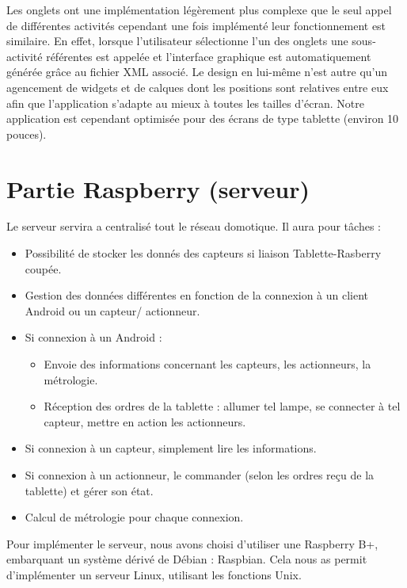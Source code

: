 \documentclass[a4paper,10pt]{article}
\begin{document}
Les onglets ont une implémentation légèrement plus complexe que le seul appel de différentes activités cependant une fois implémenté leur fonctionnement est similaire. En effet, lorsque l’utilisateur sélectionne l'un des onglets une sous-activité référentes est appelée et l’interface graphique est automatiquement générée grâce au fichier XML associé. Le design en lui-même n’est autre qu’un agencement de widgets et de calques dont les positions sont relatives entre eux afin que l’application s’adapte au mieux à toutes les tailles d’écran. Notre application est cependant optimisée pour des écrans de type tablette (environ 10 pouces).







\section{Partie Raspberry (serveur)}

Le serveur servira a centralisé tout le réseau domotique. Il aura pour tâches : \\
\begin{itemize}
	\item Possibilité de stocker les donnés des capteurs si liaison Tablette-Rasberry coupée.
	\item Gestion des données différentes en fonction de la connexion à un client Android ou un capteur/	actionneur. 
	\item Si connexion à un Android : 
		\begin{itemize}
			\item Envoie des informations concernant les capteurs, les actionneurs, la métrologie.
			\item Réception des ordres de la tablette : allumer tel lampe, se connecter à tel capteur, mettre en action les actionneurs.
		\end{itemize}
	\item Si connexion à un capteur, simplement lire les informations.
	\item Si connexion à un actionneur, le commander (selon les ordres reçu de la tablette) et gérer son état.
	\item Calcul de métrologie pour chaque connexion.
\end{itemize}

Pour implémenter le serveur, nous avons choisi d'utiliser une Raspberry B+, embarquant un système dérivé de Débian : Raspbian. Cela nous as permit d'implémenter un serveur Linux, utilisant les fonctions Unix.
\end{document}
